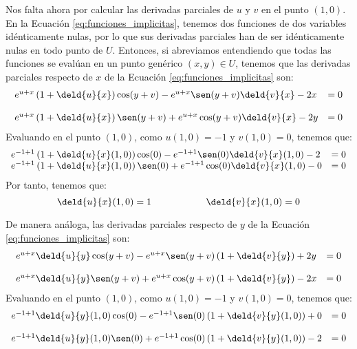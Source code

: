 \begin{ejercicio}
    Nos falta ahora por calcular las derivadas parciales de $u$ y $v$ en el punto $(1,0)$.
    En la Ecuación \ref{eq:funciones_implicitas}, tenemos dos funciones de dos variables idénticamente nulas,
    por lo que sus derivadas parciales han de ser idénticamente nulas en todo punto de $U$.
    Entonces, si abreviamos entendiendo que todas las funciones se evalúan en
    un punto genérico $(x,y)\in U$, tenemos que las derivadas parciales respecto de $x$ de la Ecuación \ref{eq:funciones_implicitas} son:
    \begin{equation*}
        \begin{array}{ll}
            e^{u+x}\left(1+\deld{u}{x}\right)\cos(y+v) - e^{u+x}\sen(y+v)\deld{v}{x} - 2x &= 0 \\ \\
            e^{u+x}\left(1+\deld{u}{x}\right)\sen(y+v) + e^{u+x}\cos(y+v)\deld{v}{x} - 2y &= 0
        \end{array}
    \end{equation*}
    Evaluando en el punto $(1,0)$, como $u(1,0)=-1$ y $v(1,0)=0$, tenemos que:
    \begin{equation*}
        \begin{array}{ll}
            e^{-1+1}\left(1+\deld{u}{x}(1,0)\right)\cos(0) - e^{-1+1}\sen(0)\deld{v}{x}(1,0) - 2 &= 0 \\
            e^{-1+1}\left(1+\deld{u}{x}(1,0)\right)\sen(0) + e^{-1+1}\cos(0)\deld{v}{x}(1,0) - 0 &= 0 \\
        \end{array}
    \end{equation*}
    Por tanto, tenemos que:
    \begin{equation*}
        \deld{u}{x}(1,0) = 1 \hspace{2cm}
        \deld{v}{x}(1,0) = 0
    \end{equation*}

    De manera análoga, las derivadas parciales respecto de $y$ de la Ecuación \ref{eq:funciones_implicitas} son:
    \begin{equation*}
        \begin{array}{ll}
            e^{u+x}\deld{u}{y}\cos(y+v) - e^{u+x}\sen(y+v)\left(1+\deld{v}{y}\right) + 2y &= 0 \\ \\
            e^{u+x}\deld{u}{y}\sen(y+v) + e^{u+x}\cos(y+v)\left(1+\deld{v}{y}\right) - 2x &= 0
        \end{array}
    \end{equation*}
    Evaluando en el punto $(1,0)$, como $u(1,0)=-1$ y $v(1,0)=0$, tenemos que:
    \begin{equation*}
        \begin{array}{ll}
            e^{-1+1}\deld{u}{y}(1,0)\cos(0) - e^{-1+1}\sen(0)\left(1+\deld{v}{y}(1,0)\right) + 0 &= 0 \\ \\
            e^{-1+1}\deld{u}{y}(1,0)\sen(0) + e^{-1+1}\cos(0)\left(1+\deld{v}{y}(1,0)\right) - 2 &= 0 \\
        \end{array}
    \end{equation*}


\end{ejercicio}
